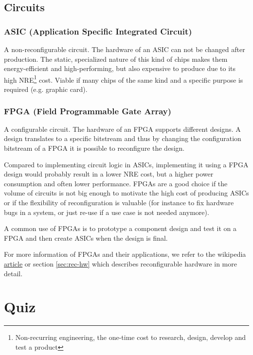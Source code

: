 \documentclass{article}
\begin{document}
\subsection{Circuits}
\subsubsection{ASIC (Application Specific Integrated Circuit)}
A non-reconfigurable circuit. The hardware of an ASIC can not be
changed after production. The static, specialized nature of this kind
of chips makes them energy-efficient and high-performing, but also
expensive to produce due to its high NRE\footnote{Non-recurring
  engineering, the one-time cost to research, design, develop and test
  a product} cost. Viable if many chips of the same kind and a
specific purpose is required (e.g. graphic card).

\subsubsection{FPGA (Field Programmable Gate Array)}
A configurable circuit. The hardware of an FPGA supports different
designs. A design translates to a specific bitstream and thus by
changing the configuration bitstream of a FPGA it is possible to
reconfigure the design.

Compared to implementing circuit logic in ASICs, implementing it using
a FPGA design would probably result in a lower NRE cost, but a higher
power consumption and often lower performance. FPGAs are a good choice
if the volume of circuits is not big enough to motivate the high cost
of producing ASICs or if the flexibility of reconfiguration is
valuable (for instance to fix hardware bugs in a system, or just
re-use if a use case is not needed anymore).

A common use of FPGAs is to prototype a component design and test it
on a FPGA and then create ASICs when the design is final.

For more information of FPGAs and their applications, we refer to the
wikipedia
\href{https://en.wikipedia.org/wiki/Field-programmable_gate_array#Applications}{article}
or section \ref{sec:rec-hw} which describes reconfigurable hardware in
more detail.
\section{Quiz}
\end{document}
